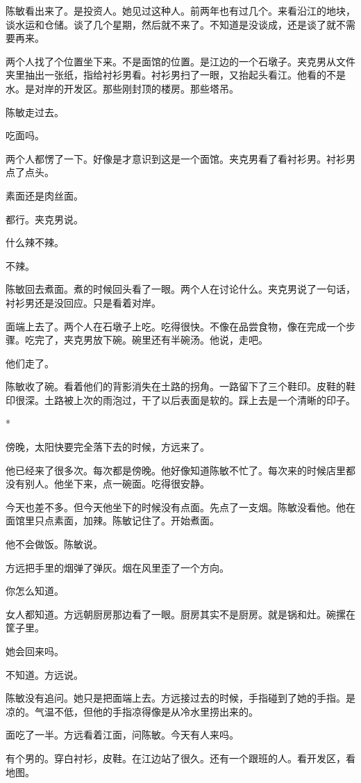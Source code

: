 \documentclass[UTF8,a5paper,11pt,openany]{ctexbook}
\newcommand{\scene}{\vspace{1em}\begin{center}*\quad*\quad*\end{center}\vspace{0.5em}}
\begin{document}
陈敏看出来了。是投资人。她见过这种人。前两年也有过几个。来看沿江的地块，谈水运和仓储。谈了几个星期，然后就不来了。不知道是没谈成，还是谈了就不需要再来。

两个人找了个位置坐下来。不是面馆的位置。是江边的一个石墩子。夹克男从文件夹里抽出一张纸，指给衬衫男看。衬衫男扫了一眼，又抬起头看江。他看的不是水。是对岸的开发区。那些刚封顶的楼房。那些塔吊。

陈敏走过去。

吃面吗。

两个人都愣了一下。好像是才意识到这是一个面馆。夹克男看了看衬衫男。衬衫男点了点头。

素面还是肉丝面。

都行。夹克男说。

什么辣不辣。

不辣。

陈敏回去煮面。煮的时候回头看了一眼。两个人在讨论什么。夹克男说了一句话，衬衫男还是没回应。只是看着对岸。

面端上去了。两个人在石墩子上吃。吃得很快。不像在品尝食物，像在完成一个步骤。吃完了，夹克男放下碗。碗里还有半碗汤。他说，走吧。

他们走了。

陈敏收了碗。看着他们的背影消失在土路的拐角。一路留下了三个鞋印。皮鞋的鞋印很深。土路被上次的雨泡过，干了以后表面是软的。踩上去是一个清晰的印子。


\scene

傍晚，太阳快要完全落下去的时候，方远来了。

他已经来了很多次。每次都是傍晚。他好像知道陈敏不忙了。每次来的时候店里都没有别人。他坐下来，点一碗面。吃得很安静。

今天也差不多。但今天他坐下的时候没有点面。先点了一支烟。陈敏没看他。他在面馆里只点素面，加辣。陈敏记住了。开始煮面。

他不会做饭。陈敏说。

方远把手里的烟弹了弹灰。烟在风里歪了一个方向。

你怎么知道。

女人都知道。方远朝厨房那边看了一眼。厨房其实不是厨房。就是锅和灶。碗摞在筐子里。

她会回来吗。

不知道。方远说。

陈敏没有追问。她只是把面端上去。方远接过去的时候，手指碰到了她的手指。是凉的。气温不低，但他的手指凉得像是从冷水里捞出来的。

面吃了一半。方远看着江面，问陈敏。今天有人来吗。

有个男的。穿白衬衫，皮鞋。在江边站了很久。还有一个跟班的人。看开发区，看地图。
\end{document}
